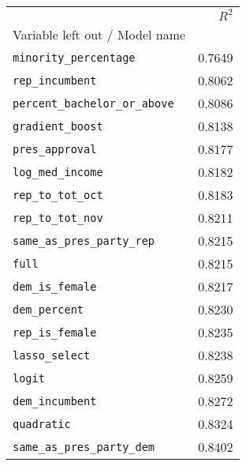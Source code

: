\begin{tabular}{lr}
\toprule
{} &  $R^2$ \\
Variable left out / Model name        &        \\
\midrule
\texttt{minority\_percentage}         & 0.7649 \\
\texttt{rep\_incumbent}               & 0.8062 \\
\texttt{percent\_bachelor\_or\_above} & 0.8086 \\
\texttt{gradient\_boost}              & 0.8138 \\
\texttt{pres\_approval}               & 0.8177 \\
\texttt{log\_med\_income}             & 0.8182 \\
\texttt{rep\_to\_tot\_oct}            & 0.8183 \\
\texttt{rep\_to\_tot\_nov}            & 0.8211 \\
\texttt{same\_as\_pres\_party\_rep}   & 0.8215 \\
\texttt{full}                         & 0.8215 \\
\texttt{dem\_is\_female}              & 0.8217 \\
\texttt{dem\_percent}                 & 0.8230 \\
\texttt{rep\_is\_female}              & 0.8235 \\
\texttt{lasso\_select}                & 0.8238 \\
\texttt{logit}                        & 0.8259 \\
\texttt{dem\_incumbent}               & 0.8272 \\
\texttt{quadratic}                    & 0.8324 \\
\texttt{same\_as\_pres\_party\_dem}   & 0.8402 \\
\bottomrule
\end{tabular}
